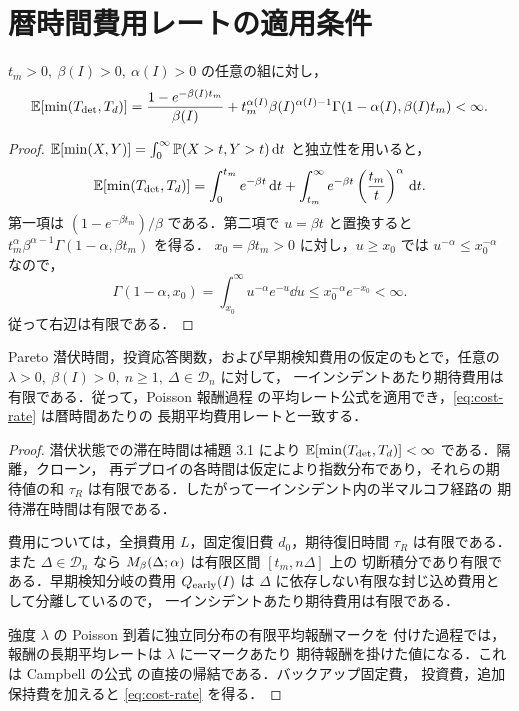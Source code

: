 \section{暦時間費用レートの適用条件}

\begin{lemma}[潜伏状態の平均滞在時間の有限性]
$t_m>0,\ \beta(I)>0,\ \alpha(I)>0$ の任意の組に対し，
\[
  \mathbb{E}[\min(T_{\mathrm{det}},T_d)]
  =\frac{1-e^{-\beta(I)t_m}}{\beta(I)}
  +t_m^{\alpha(I)}\beta(I)^{\alpha(I)-1}
  \Gamma(1-\alpha(I),\beta(I)t_m)
  <\infty .
  \label{eq:min-finite}
\]
\end{lemma}

\begin{proof}
$\mathbb{E}[\min(X,Y)]=\int_0^\infty\mathbb{P}(X>t,Y>t)\,\mathrm{d} t$ と独立性を用いると，
\[
  \mathbb{E}[\min(T_{\mathrm{det}},T_d)]
  =\int_0^{t_m}e^{-\beta t}\,\mathrm{d} t
  +\int_{t_m}^{\infty}e^{-\beta t}\left(\frac{t_m}{t}\right)^\alpha\,\mathrm{d} t .
\]
第一項は $(1-e^{-\beta t_m})/\beta$ である．第二項で $u=\beta t$ と置換すると
$t_m^\alpha\beta^{\alpha-1}\Gamma(1-\alpha,\beta t_m)$ を得る．
$x_0=\beta t_m>0$ に対し，$u\ge x_0$ では $u^{-\alpha}\le x_0^{-\alpha}$ なので，
\[
  \Gamma(1-\alpha,x_0)
  =\int_{x_0}^{\infty}u^{-\alpha}e^{-u}\dd u
  \le x_0^{-\alpha}e^{-x_0}<\infty .
\]
従って右辺は有限である．
\end{proof}

\begin{theorem}[暦時間費用レートの適用可能性]
Pareto 潜伏時間，投資応答関数，および早期検知費用の仮定のもとで，任意の
$\lambda>0,\ \beta(I)>0,\ n\ge1,\ \Delta\in\mathcal{D}_n$ に対して，
一インシデントあたり期待費用は有限である．従って，Poisson 報酬過程
の平均レート公式を適用でき，\eqref{eq:cost-rate} は暦時間あたりの
長期平均費用レートと一致する．
\end{theorem}

\begin{proof}
潜伏状態での滞在時間は補題 3.1 により
$\mathbb{E}[\min(T_{\mathrm{det}},T_d)]<\infty$ である．隔離，クローン，
再デプロイの各時間は仮定により指数分布であり，それらの期待値の和
$\tau_R$ は有限である．したがって一インシデント内の半マルコフ経路の
期待滞在時間は有限である．

費用については，全損費用 $L$，固定復旧費 $d_0$，期待復旧時間
$\tau_R$ は有限である．また $\Delta\in\mathcal{D}_n$ なら
$M_\beta(\Delta;\alpha)$ は有限区間 $[t_m,n\Delta]$ 上の
切断積分であり有限である．早期検知分岐の費用 $Q_{\mathrm{early}}(I)$ は
$\Delta$ に依存しない有限な封じ込め費用として分離しているので，
一インシデントあたり期待費用は有限である．

強度 $\lambda$ の Poisson 到着に独立同分布の有限平均報酬マークを
付けた過程では，報酬の長期平均レートは $\lambda$ に一マークあたり
期待報酬を掛けた値になる．これは Campbell の公式
\cite{cox1962,ross2014} の直接の帰結である．バックアップ固定費，
投資費，追加保持費を加えると \eqref{eq:cost-rate} を得る．
\end{proof}
